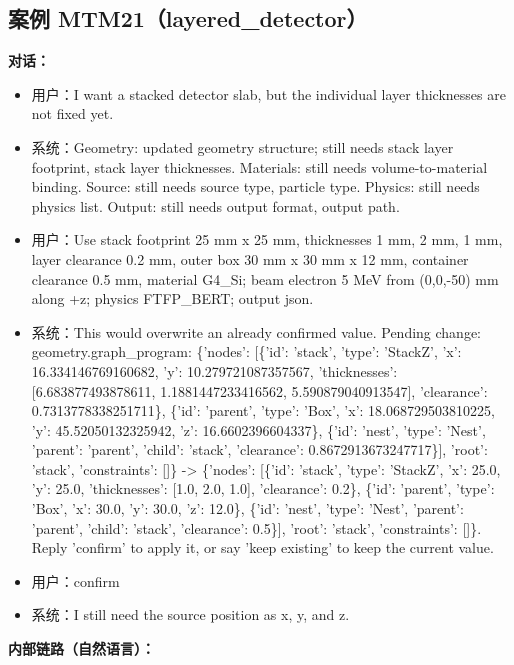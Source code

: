 \documentclass[11pt]{ctexart}
\begin{document}
\subsection{案例 MTM21（layered\_detector）}
\textbf{对话：}
\begin{itemize}
\item 用户：I want a stacked detector slab, but the individual layer thicknesses are not fixed yet.
\item 系统：Geometry: updated geometry structure; still needs stack layer footprint, stack layer thicknesses. Materials: still needs volume-to-material binding. Source: still needs source type, particle type. Physics: still needs physics list. Output: still needs output format, output path.
\item 用户：Use stack footprint 25 mm x 25 mm, thicknesses 1 mm, 2 mm, 1 mm, layer clearance 0.2 mm, outer box 30 mm x 30 mm x 12 mm, container clearance 0.5 mm, material G4\_Si; beam electron 5 MeV from (0,0,-50) mm along +z; physics FTFP\_BERT; output json.
\item 系统：This would overwrite an already confirmed value. Pending change: geometry.graph\_program: \{'nodes': [\{'id': 'stack', 'type': 'StackZ', 'x': 16.334146769160682, 'y': 10.279721087357567, 'thicknesses': [6.683877493878611, 1.1881447233416562, 5.590879040913547], 'clearance': 0.7313778338251711\}, \{'id': 'parent', 'type': 'Box', 'x': 18.068729503810225, 'y': 45.52050132325942, 'z': 16.6602396604337\}, \{'id': 'nest', 'type': 'Nest', 'parent': 'parent', 'child': 'stack', 'clearance': 0.8672913673247717\}], 'root': 'stack', 'constraints': []\} -> \{'nodes': [\{'id': 'stack', 'type': 'StackZ', 'x': 25.0, 'y': 25.0, 'thicknesses': [1.0, 2.0, 1.0], 'clearance': 0.2\}, \{'id': 'parent', 'type': 'Box', 'x': 30.0, 'y': 30.0, 'z': 12.0\}, \{'id': 'nest', 'type': 'Nest', 'parent': 'parent', 'child': 'stack', 'clearance': 0.5\}], 'root': 'stack', 'constraints': []\}. Reply 'confirm' to apply it, or say 'keep existing' to keep the current value.
\item 用户：confirm
\item 系统：I still need the source position as x, y, and z.
\end{itemize}
\textbf{内部链路（自然语言）：}
\end{document}
